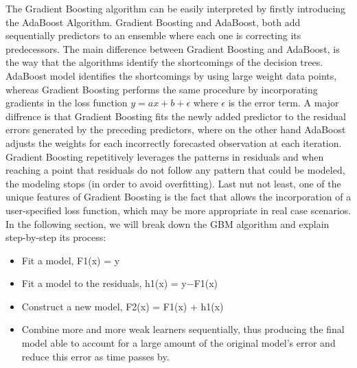 \par The Gradient Boosting algorithm can be easily interpreted by firstly introducing the AdaBoost Algorithm. Gradient Boosting and AdaBoost, both add sequentially predictors to an ensemble where each one is correcting its predecessors. The main difference between Gradient Boosting and AdaBoost, is the way that the algorithms identify the shortcomings of the decision trees. AdaBoost model identifies the shortcomings by using large weight data points, whereas Gradient Boosting performs the same procedure by incorporating gradients in the loss function $y=ax+b+\epsilon$ where $\epsilon$ is the error term. A major diffrence is that Gradient Boosting fits the newly added predictor to the residual errors generated by the preceding predictors, where on the other hand AdaBoost adjusts the weights for each incorrectly forecasted observation at each iteration. Gradient Boosting repetitively leverages the patterns in residuals and when reaching a point that residuals do not follow any pattern that could be modeled, the modeling stops (in order to avoid overfitting). Last nut not least, one of the unique features of Gradient Boosting is the fact that allows the incorporation of a user-specified loss function, which may be more appropriate in real case scenarios.
In the following section, we will break down the GBM algorithm and explain step-by-step its process:
\begin{itemize}
    \item Fit a model, F1(x) = y
    \item Fit a model to the residuals, h1(x) = y−F1(x)
    \item Construct a new model, F2(x) = F1(x) + h1(x)
    \item Combine more and more weak learners sequentially, thus producing the final model able to account for a large amount of the original model's error and reduce this error as time passes by.
\end{itemize}{}

